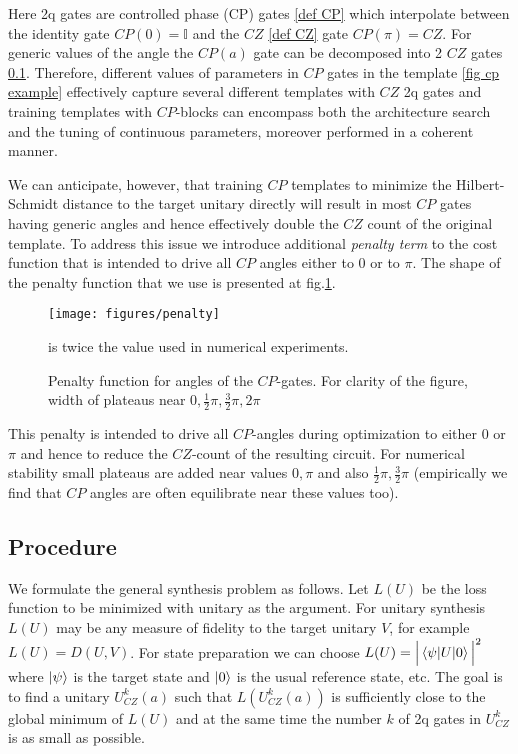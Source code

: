 \documentclass[amsfonts, amssymb, aps, nofootinbib]{revtex4-2}
\begin{document}
Here 2q gates are controlled phase (CP) gates \eqref{def CP} which interpolate between the identity gate $CP(0)=\mathbb{I}$ and the $CZ$ \eqref{def CZ} gate $CP(\pi)=CZ$. For generic values of the angle the $CP(a)$ gate can be decomposed into 2 $CZ$ gates \ref{}. Therefore, different values of parameters in $CP$ gates in the template \eqref{fig cp example} effectively capture several different templates with $CZ$ 2q gates and training templates with $CP$-blocks can encompass both the architecture search and the tuning of continuous parameters, moreover performed in a coherent manner.


We can anticipate, however, that training $CP$ templates to minimize the Hilbert-Schmidt distance to the target unitary directly will result in most $CP$ gates having generic angles and hence effectively double the $CZ$ count of the original template. To address this issue we introduce additional \textit{penalty term} to the cost function that is intended to drive all $CP$ angles either to $0$ or to $\pi$. The shape of the penalty function that we use is presented at fig.\ref{fig penalty}.
\begin{figure}[h!]
\texttt{[image: figures/penalty]}
\caption{Penalty function for angles of the $CP$-gates. For clarity of the figure, width of plateaus near $0,\frac12\pi, \frac32\pi, 2\pi$} is twice the value used in numerical experiments.
\label{fig penalty}
\end{figure}

This penalty is intended to drive all $CP$-angles during optimization to either $0$ or $\pi$ and hence to reduce the $CZ$-count of the resulting circuit. For numerical stability small plateaus are added near values $0,\pi$ and also $\frac12\pi, \frac32\pi$  (empirically we find that $CP$ angles are often equilibrate near these values too).

\subsection{Procedure}
We formulate the general synthesis problem as follows. Let $L(U)$ be the loss function to be minimized with unitary as the argument. For unitary synthesis $L(U)$ may be any measure of fidelity to the target unitary $V$, for example $L(U)=D(U, V)$. For state preparation we can choose $L(U) = \Big|\braket{\psi|U|0}\Big|^2$ where $\ket{\psi}$ is the target state and $\ket{0}$ is the usual reference state, etc. The goal is to find a unitary $U^k_{CZ}(a)$ such that $L(U^k_{CZ}(a))$ is sufficiently close to the global minimum of $L(U)$ and at the same time the number $k$ of 2q gates in $U^k_{CZ}$ is as small as possible. 
\end{document}
